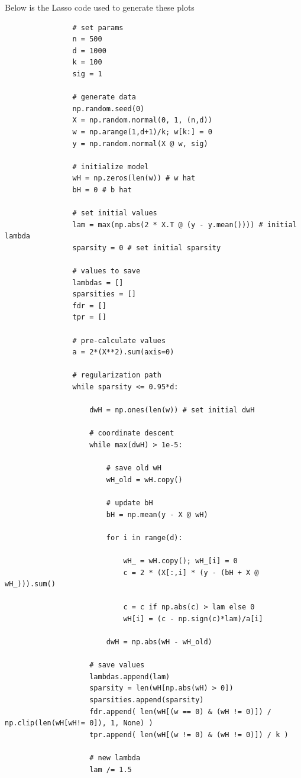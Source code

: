 \documentclass{article}
\begin{document}
\begin{enumerate}
        Below is the Lasso code used to generate these plots
        \begin{verbatim}
                # set params
                n = 500
                d = 1000
                k = 100
                sig = 1
                
                # generate data
                np.random.seed(0)
                X = np.random.normal(0, 1, (n,d))
                w = np.arange(1,d+1)/k; w[k:] = 0
                y = np.random.normal(X @ w, sig)
                
                # initialize model
                wH = np.zeros(len(w)) # w hat
                bH = 0 # b hat
                
                # set initial values
                lam = max(np.abs(2 * X.T @ (y - y.mean()))) # initial lambda
                sparsity = 0 # set initial sparsity
                
                # values to save
                lambdas = []
                sparsities = []
                fdr = []
                tpr = []
                
                # pre-calculate values
                a = 2*(X**2).sum(axis=0)
                
                # regularization path
                while sparsity <= 0.95*d:
                    
                    dwH = np.ones(len(w)) # set initial dwH
                    
                    # coordinate descent
                    while max(dwH) > 1e-5:
                        
                        # save old wH
                        wH_old = wH.copy()
                
                        # update bH
                        bH = np.mean(y - X @ wH)
                        
                        for i in range(d):
                            
                            wH_ = wH.copy(); wH_[i] = 0
                            c = 2 * (X[:,i] * (y - (bH + X @ wH_))).sum()
                            
                            c = c if np.abs(c) > lam else 0
                            wH[i] = (c - np.sign(c)*lam)/a[i]
                            
                        dwH = np.abs(wH - wH_old)
                        
                    # save values
                    lambdas.append(lam)
                    sparsity = len(wH[np.abs(wH) > 0])
                    sparsities.append(sparsity)
                    fdr.append( len(wH[(w == 0) & (wH != 0)]) / np.clip(len(wH[wH!= 0]), 1, None) )
                    tpr.append( len(wH[(w != 0) & (wH != 0)]) / k )
                    
                    # new lambda
                    lam /= 1.5 
                        \end{verbatim}
\end{enumerate}
\end{document}

